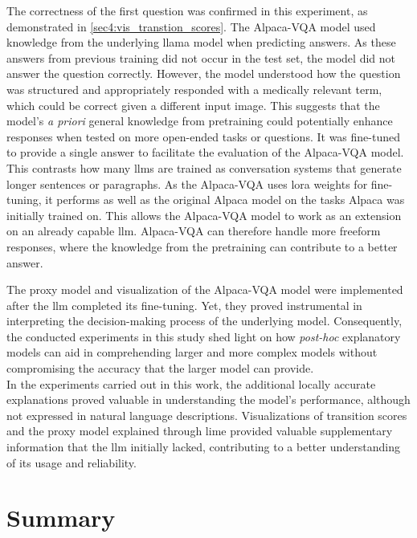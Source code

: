 The correctness of the first question was confirmed in this experiment, as demonstrated in \autoref{sec4:vis_transtion_scores}. The Alpaca-VQA model used knowledge from the underlying \gls{llama} model when predicting answers. As these answers from previous training did not occur in the test set, the model did not answer the question correctly. However, the model understood how the question was structured and appropriately responded with a medically relevant term, which could be correct given a different input image.
This suggests that the model's \textit{a priori} general knowledge from pretraining could potentially enhance responses when tested on more open-ended tasks or questions. It was fine-tuned to provide a single answer to facilitate the evaluation of the Alpaca-VQA model. This contrasts how many \glspl{llm} are trained as conversation systems that generate longer sentences or paragraphs. As the Alpaca-VQA uses \gls{lora} weights for fine-tuning, it performs as well as the original Alpaca model on the tasks Alpaca was initially trained on. This allows the Alpaca-VQA model to work as an extension on an already capable \gls{llm}. Alpaca-VQA can therefore handle more freeform responses, where the knowledge from the pretraining can contribute to a better answer.

The proxy model and visualization of the Alpaca-VQA model were implemented after the \gls{llm} completed its fine-tuning. Yet, they proved instrumental in interpreting the decision-making process of the underlying model. 
Consequently, the conducted experiments in this study shed light on how \textit{post-hoc} explanatory models can aid in comprehending larger and more complex models without compromising the accuracy that the larger model can provide.\\


In the experiments carried out in this work, the additional locally accurate explanations proved valuable in understanding the model's performance, although not expressed in natural language descriptions. Visualizations of transition scores and the proxy model explained through \gls{lime} provided valuable supplementary information that the \gls{llm} initially lacked, contributing to a better understanding of its usage and reliability.










\section{Summary}
\label{sec4:summary}

